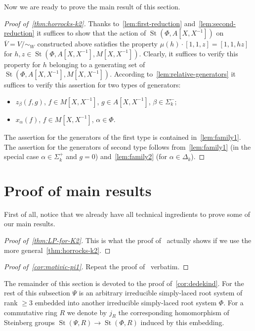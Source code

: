 \documentclass[oneside, 10pt]{amsart}
\DeclareMathOperator{\St}{St}
\newcommand{\inv}{^{-1}}
\numberwithin{equation}{section}
\numberwithin{thm}{section}
\numberwithin{lemma}{section}
\theoremstyle{definition}
\theoremstyle{remark}
\begin{document}
Now we are ready to prove the main result of this section.
\begin{proof}[Proof of~\cref{thm:horrocks-k2}]
Thanks to~\cref{lem:first-reduction} and~\cref{lem:second-reduction} it suffices to show that the action of
$\St(\Phi, A[X, X\inv])$ on $\overline{V} = V/\sim_W$ constructed above satisfies the property
$\mu(h) \cdot [1, 1, z] = [1, 1, hz]$ for $h, z \in \St(\Phi, A[X, X\inv], M[X, X\inv])$.
Clearly, it suffices to verify this property for $h$ belonging to a generating set of $\St(\Phi, A[X, X\inv], M[X, X\inv])$.
According to~\cref{lem:relative-generators} it suffices to verify this assertion for two types of generators:
\begin{itemize}
\item $z_{\beta}(f, g)$, $f \in M[X, X\inv]$, $g \in A[X, X\inv]$, $\beta \in \Sigma_k^-$;
\item $x_\alpha(f)$, $f \in M[X, X\inv]$, $\alpha \in \Phi$.
\end{itemize}
The assertion for the generators of the first type is contained in~\cref{lem:family1}.
The assertion for the generators of second type follows from~\cref{lem:family1} (in the special case $\alpha \in \Sigma_k^+$ and $g = 0$) and~\cref{lem:family2} (for $\alpha \in \Delta_k$).
\end{proof}


\section{Proof of main results} \label{sec:main}
First of all, notice that we already have all technical ingredients to prove
some of our main results.

\begin{proof}[Proof of~\cref{thm:LP-for-K2}]
This is what the proof of~\cite[Theorem~1.1]{LSV2} actually shows if we use the more general~\cref{thm:horrocks-k2}.
\end{proof}

\begin{proof}[Proof of~\cref{cor:motivic-pi1}]
Repeat the proof of~\cite[Corollary~1.2]{LSV2} verbatim.
\end{proof}

The remainder of this section is devoted to the proof of~\cref{cor:dedekind}.
For the rest of this subsection $\Psi$ is an arbitrary irreducible simply-laced root system of rank $\geq 3$ embedded into another irreducible simply-laced root system $\Phi$.
For a commutative ring $R$ we denote by $j_R$ the corresponding homomorphism of Steinberg groups $\St(\Psi, R) \to \St(\Phi, R)$ induced by this embedding.
\end{document}
